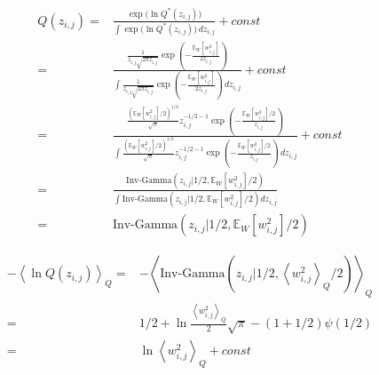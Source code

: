 \documentclass[10pt]{article}
\newcommand{\Angle}[1]{\left \langle #1 \right \rangle}
\newcommand{\Eq}[1]{\Angle{#1}_Q}
\begin{document}
	\begin{align}
		Q(z_{i,j})=&\frac{\exp(\ln{Q^*(z_{i,j}))}}{\int{\exp(\ln{Q^*(z_{i,j}))}} \, dz_{i,j}} + const \\
		=&\frac{\frac{1}{z_{i,j}\sqrt{2\pi z_{i,j}}}\exp \left( -\frac{ \mathbb{E}_{W} \left[ w_{i,j}^2 \right] }{2z_{i,j}} \right)}{\int{\frac{1}{z_{i,j}\sqrt{2\pi z_{i,j}}}\exp \left( -\frac{ \mathbb{E}_{W} \left[ w_{i,j}^2 \right] }{2z_{i,j}} \right) \, dz_{i,j}}} + const \\
		=&\frac{\frac{\left( \mathbb{E}_{W} \left[ w_{i,j}^2 \right]/2 \right)^{1/2}}{\sqrt{\pi}} z_{i,j}^{-1/2-1}\exp \left( -\frac{\mathbb{E}_{W} \left[ w_{i,j}^2 \right]/2}{z_{i,j}} \right)}{\int{\frac{\left( \mathbb{E}_{W} \left[ w_{i,j}^2 \right]/2 \right)^{1/2}}{\sqrt{\pi}} z_{i,j}^{-1/2-1}\exp \left( -\frac{\mathbb{E}_{W} \left[ w_{i,j}^2 \right]/2}{z_{i,j}} \right) \, dz_{i,j}}} + const \\
		=&\frac{\text{Inv-Gamma}(z_{i,j}|1/2,\mathbb{E}_{W} \left[ w_{i,j}^2 \right]/2)}{\int \text{Inv-Gamma}(z_{i,j}|1/2,\mathbb{E}_{W} \left[ w_{i,j}^2 \right]/2)dz_{i,j}} \\
		=&\text{Inv-Gamma}(z_{i,j}|1/2,\mathbb{E}_{W} \left[ w_{i,j}^2 \right]/2)
	\end{align}
	
	\begin{align}
		-\Eq{\ln{Q(z_{i,j})}}=&-\Eq{\text{Inv-Gamma}(z_{i,j}|1/2,\Eq{w_{i,j}^2}/2)} \\
		=&1/2+\ln{\frac{\Eq{w_{i,j}^2}}{2}\sqrt{\pi}}-(1+1/2)\psi(1/2) \\
		=&\ln{\Eq{w_{i,j}^2}} + const
	\end{align}
	
\end{document}
